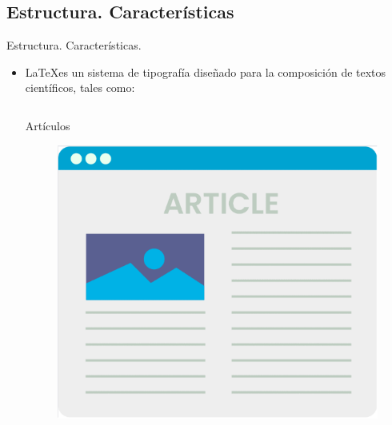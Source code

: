 \documentclass[aspectratio=169, 10pt]{beamer}
\begin{document}
\subsection{Estructura. Características}
\begin{frame}{Estructura. Características.}

\begin{itemize}
    \item \LaTeX es un sistema de tipografía diseñado para la composición de textos científicos, tales como:
    \vspace{5mm} \pause
    
\begin{columns}
    \begin{column}{.16\linewidth}
    \centering
    Artículos
    \begin{figure}[H]
        \centering
        \includegraphics[scale=.1]{article.png} 
    \end{figure}
    \end{column} \pause


\end{columns}
\end{itemize}
\end{frame}
\end{document}
